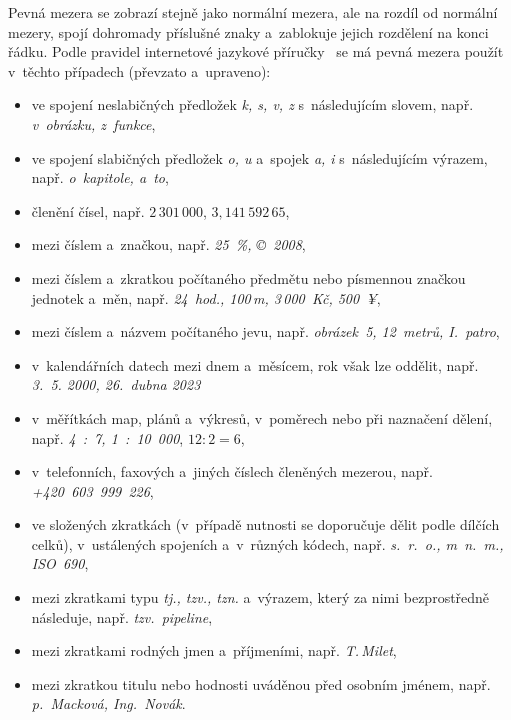 Pevná mezera se zobrazí stejně jako normální mezera, ale na rozdíl od normální
mezery, spojí dohromady příslušné znaky a~zablokuje jejich rozdělení na konci
řádku. Podle pravidel internetové jazykové příručky~\cite[Cesta: \emph{Dopisy a~grafická úprava písemností}~>~\emph{Zalomení řádků a~nevhodné výrazy na jejich konci}]{Ustav_pro_jazyk_cesky}
se má pevná mezera použít v~těchto případech (převzato a~upraveno):
\begin{itemize}
    \item ve spojení neslabičných předložek \emph{k, s, v, z} s~následujícím
    slovem, např. \emph{v~obrázku, z~funkce},
    \item ve spojení slabičných předložek \emph{o, u} a~spojek \emph{a, i}
    s~následujícím výrazem, např. \emph{o~kapitole, a~to},
    \item členění čísel, např. $\mathit{2\,301\,000}$, $\mathit{3,\!141\,592\,65}$,
    \item mezi číslem a~značkou, např. \emph{25~\%, \copyright~2008},
    \item mezi číslem a~zkratkou počítaného předmětu nebo písmennou značkou
    jednotek a~měn, např. \emph{24~hod., 100\,m, 3\,000~Kč, 500~¥},
    \item mezi číslem a~názvem počítaného jevu, např. \emph{obrázek~5, 12~metrů,
    I.~patro},
    \item v~kalendářních datech mezi dnem a~měsícem, rok však lze oddělit, např.
    \emph{3.~5. 2000, 26.~dubna 2023}
    \item v~měřítkách map, plánů a~výkresů, v~poměrech nebo při naznačení dělení,
    např. \emph{4~:~7, 1~:~10~000}, $\mathit{12:2=6}$,
    \item v~telefonních, faxových a~jiných číslech členěných mezerou, např. 
    \emph{+420~603~999~226},
    \item ve složených zkratkách (v~případě nutnosti se doporučuje dělit podle
    dílčích celků), v~ustálených spojeních a~v~různých kódech, např.
    \emph{s.~r.~o., m~n.~m., ISO~690},
    \item mezi zkratkami typu \emph{tj., tzv., tzn.} a~výrazem, který za nimi
    bezprostředně následuje, např. \emph{tzv.~pipeline},
    \item mezi zkratkami rodných jmen a~příjmeními, např. \emph{T.\,Milet},
    \item mezi zkratkou titulu nebo hodnosti uváděnou před osobním jménem, např.
    \emph{p.~Macková, Ing.~Novák}.
\end{itemize}

